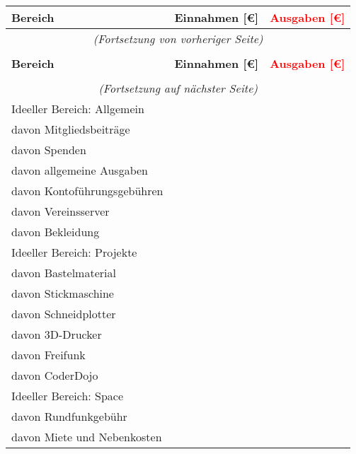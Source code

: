 \documentclass{s0minutes}
\begin{document}
\begin{longtable}{lr>{\textcolor{red}\bgroup}r<{\egroup}}
  \textbf{Bereich} & \textbf{Einnahmen [€]} & \textbf{Ausgaben [€]} \\
  \midrule
  \endfirsthead
  \multicolumn{3}{c}{\emph{(Fortsetzung von vorheriger Seite)}} \\
  \\
  \textbf{Bereich} & \textbf{Einnahmen [€]} & \textbf{Ausgaben [€]} \\
  \midrule
  \endhead
  \\
  \multicolumn{3}{c}{\emph{(Fortsetzung auf nächster Seite)}} \\
  \endfoot
  \endlastfoot
  Ideeller Bereich: Allgemein       &               &                \\
  \quad davon Mitgliedsbeiträge     &               &                \\
  \quad davon Spenden               &               &                \\
  \quad davon allgemeine Ausgaben   &               &                \\
  \quad davon Kontoführungsgebühren &               &                \\
  \quad davon Vereinsserver         &               &                \\
  \quad davon Bekleidung            &               &                \\
  \midrule
  Ideeller Bereich: Projekte        &               &                \\
  \quad davon Bastelmaterial        &               &                \\
  \quad davon Stickmaschine         &               &                \\
  \quad davon Schneidplotter        &               &                \\
  \quad davon 3D-Drucker            &               &                \\
  \quad davon Freifunk              &               &                \\
  \quad davon CoderDojo             &               &                \\
  \midrule
  Ideeller Bereich: Space           &               &                \\
  \quad davon Rundfunkgebühr        &               &                \\
  \quad davon Miete und Nebenkosten &               &                \\

\end{longtable}
\end{document}
